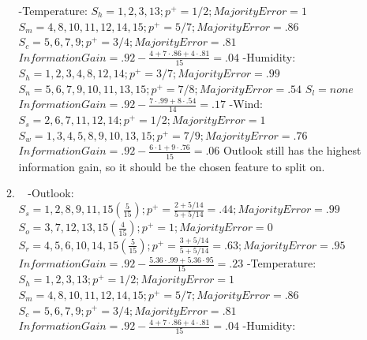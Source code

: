 \documentclass[12pt, fullpage,letterpaper]{article}
\begin{document}
\begin{enumerate}
\begin{enumerate}
	\newline -Temperature:
	\newline $S_h = 1, 2, 3, 13; p^+=1/2; Majority Error=1$
	\newline $S_m=4, 8, 10, 11, 12, 14, 15; p^+=5/7; Majority Error=.86$
	\newline $S_c=5, 6, 7, 9; p^+=3/4; Majority Error=.81$
	\newline $Information Gain=.92-\frac{4+7\cdot.86+4\cdot.81}{15}=.04$
	\newline -Humidity:
	\newline $S_h = 1, 2, 3, 4, 8, 12, 14; p^+=3/7; Majority Error=.99$
	\newline $S_n=5, 6, 7, 9, 10, 11, 13, 15; p^+=7/8; Majority Error=.54$
	\newline $S_l=none$
	\newline $Information Gain=.92-\frac{7\cdot.99+8\cdot.54}{14}=.17$
	\newline -Wind:
	\newline $S_s = 2, 6, 7, 11, 12, 14; p^+=1/2; Majority Error=1$
	\newline $S_w=1, 3, 4, 5, 8, 9, 10, 13, 15; p^+=7/9; Majority Error=.76$
	\newline $Information Gain=.92-\frac{6\cdot1+9\cdot.76}{15}=.06$
	\newline
	\newline Outlook still has the highest information gain, so it should be the chosen feature to split on.
\item~
\newline -Outlook:
	\newline $S_s = 1, 2,8, 9, 11, 15(\frac{5}{15}); p^+=\frac{2+5/14}{5+5/14}=.44; Majority Error=.99$
	\newline $S_o=3, 7, 12, 13, 15(\frac{4}{15}); p^+ = 1; Majority Error=0$
	\newline $S_r=4, 5, 6, 10, 14, 15(\frac{5}{15}); p^+=\frac{3+5/14}{5+5/14}=.63; Majority Error=.95$
	\newline $Information Gain=.92-\frac{5.36\cdot.99+5.36\cdot95}{15}=.23$
	\newline -Temperature:
	\newline $S_h = 1, 2, 3, 13; p^+=1/2; Majority Error=1$
	\newline $S_m=4, 8, 10, 11, 12, 14, 15; p^+=5/7; Majority Error=.86$
	\newline $S_c=5, 6, 7, 9; p^+=3/4; Majority Error=.81$
	\newline $Information Gain=.92-\frac{4+7\cdot.86+4\cdot.81}{15}=.04$
	\newline -Humidity:

\end{enumerate}
\end{enumerate}
\end{document}
